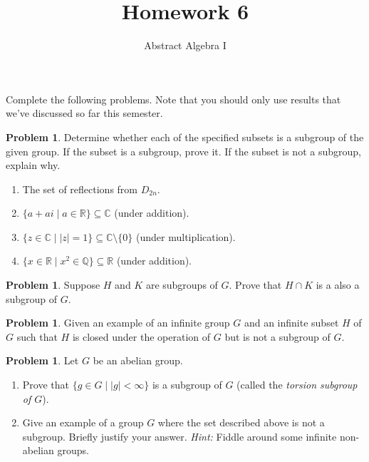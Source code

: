 \documentclass[11pt]{scrartcl}
\theoremstyle{definition}
\newtheorem{problem}[theorem]{Problem}
\begin{document}
\title{Homework 6}
\subtitle{Abstract Algebra I}
\date{}

\maketitle
\thispagestyle{fancy}

Complete the following problems. Note that you should only use results that we've discussed so far this semester. 

\begin{problem}
Determine whether each of the specified subsets is a subgroup of the given group. If the subset is a subgroup, prove it.  If the subset is not a subgroup, explain why.
\begin{enumerate}[label=\rm{(\alph*)}]
\item The set of reflections from $D_{2n}$.
\item $\{a+ai\mid a\in\mathbb{R}\}\subseteq\mathbb{C}$ (under addition).
\item $\{z\in\mathbb{C}\mid |z|=1\}\subseteq\mathbb{C}\setminus\{0\}$ (under multiplication).
\item $\{x\in\mathbb{R}\mid x^2\in\mathbb{Q}\}\subseteq\mathbb{R}$ (under addition).
\end{enumerate}
\end{problem}

\begin{problem}
Suppose $H$ and $K$ are subgroups of $G$.  Prove that $H\cap K$ is a also a subgroup of $G$.
\end{problem}

\begin{problem}
Given an example of an infinite group $G$ and an infinite subset $H$ of $G$ such that $H$ is closed under the operation of $G$ but is not a subgroup of $G$.
\end{problem}

\begin{problem}
Let $G$ be an abelian group.  
\begin{enumerate}[label=\rm{(\alph*)}]
\item Prove that $\{g\in G\mid |g|<\infty\}$ is a subgroup of $G$ (called the \emph{torsion subgroup of $G$}).  
\item Give an example of a group $G$ where the set described above is not a subgroup. Briefly justify your answer.  \emph{Hint:}  Fiddle around some infinite non-abelian groups.
\end{enumerate} 
\end{problem}
\end{document}
